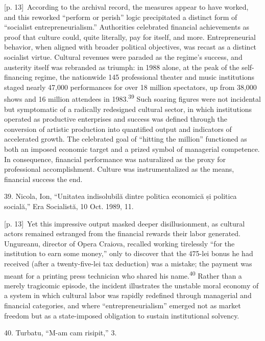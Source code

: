 \documentclass[10pt,a4paper]{article}
\begin{document}
{\scriptsize\color{gray} [p. 13]}\ According to the archival record, the measures appear to have worked, and this reworked “perform or perish” logic precipitated a distinct form of “socialist entrepreneurialism.” Authorities celebrated financial achievements as proof that culture could, quite literally, pay for itself, and more. Entrepreneurial behavior, when aligned with broader political objectives, was recast as a distinct socialist virtue. Cultural revenues were paraded as the regime’s success, and austerity itself was rebranded as triumph: in 1988 alone, at the peak of the self-financing regime, the nationwide 145 professional theater and music institutions staged nearly 47,000 performances for over 18 million spectators, up from 38,000 shows and 16 million attendees in 1983.\nobreak\textsuperscript{39} Such soaring figures were not incidental but symptomatic of a radically redesigned cultural sector, in which institutions operated as productive enterprises and success was defined through the conversion of artistic production into quantified output and indicators of accelerated growth. The celebrated goal of “hitting the million” functioned as both an imposed economic target and a prized symbol of managerial competence. In consequence, financial performance was naturalized as the proxy for professional accomplishment. Culture was instrumentalized as the means, financial success the end.\par{\small 39. Nicola, Ion, “Unitatea indisolubilă dintre politica economică și politica socială,” Era Socialistă, 10 Oct. 1989, 11.\par}
{\scriptsize\color{gray} [p. 13]}\ Yet this impressive output masked deeper disillusionment, as cultural actors remained estranged from the financial rewards their labor generated. Ungureanu, director of Opera Craiova, recalled working tirelessly “for the institution to earn some money,” only to discover that the 475-lei bonus he had received (after a twenty-five-lei tax deduction) was a mistake; the payment was meant for a printing press technician who shared his name.\nobreak\textsuperscript{40} Rather than a merely tragicomic episode, the incident illustrates the unstable moral economy of a system in which cultural labor was rapidly redefined through managerial and financial categories, and where “entrepreneurialism” emerged not as market freedom but as a state-imposed obligation to sustain institutional solvency.\par{\small 40. Turbatu, “M-am cam risipit,” 3.\par}
\end{document}
